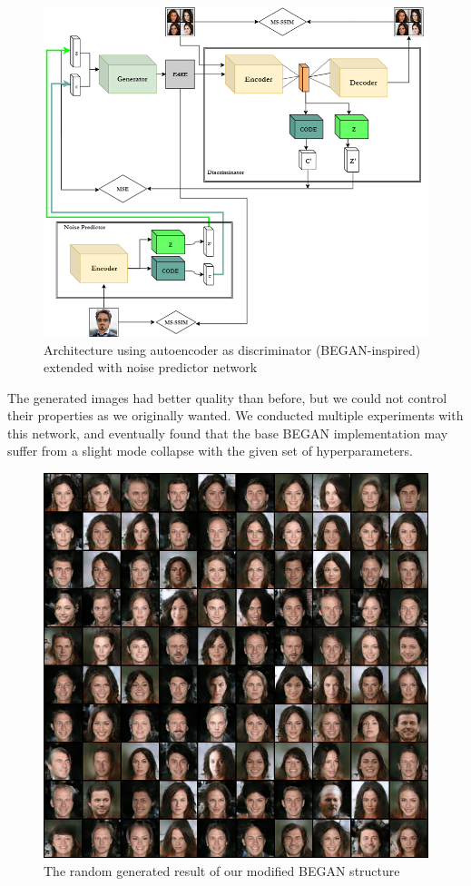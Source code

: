 \documentclass{egpubl}
\begin{document}
\begin{figure}[!htb]
	\centering
	\includegraphics[width=\linewidth]{pic/BInfoGAN+predictor}
	\caption{Architecture using autoencoder as discriminator (BEGAN-inspired) extended with noise predictor network}
	\label{fig:infogan_ae_noise}
\end{figure}

The generated images had better quality than before, %
but we could not control their properties as we originally wanted. We conducted multiple experiments with this network, %
and eventually found %
that the base BEGAN implementation may suffer %
from a slight %
mode collapse with the given set of hyperparameters.

\begin{figure}[!htb]
	\centering
	\includegraphics[width=\linewidth]{pic/InfoBegan_random_result}
	\caption{The random generated result of our modified BEGAN structure}
	
\end{figure}
\end{document}
